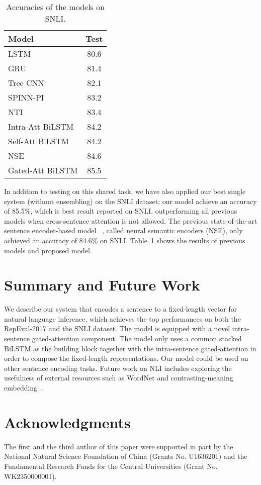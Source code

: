\documentclass[11pt,letterpaper]{article}
\begin{document}
\begin{table}[t!]
\renewcommand{\arraystretch}{0.9}
\centering
\begin{tabular}{|l|c|}
\hline
Model     & Test\\
\hline
LSTM~\citep{Bowman:D15-1075} & 80.6 \\
GRU~\citep{DBLP:journals/corr/VendrovKFU15} & 81.4 \\
Tree CNN~\citep{Mou:P16-2022} & 82.1 \\
SPINN-PI~\citep{Bowman:P16-1139} & 83.2 \\
NTI~\citep{DBLP:journals/corr/MunkhdalaiY16b} & 83.4 \\
Intra-Att BiLSTM~\citep{DBLP:journals/corr/LiuSLW16} & 84.2 \\
Self-Att BiLSTM~\citep{DBLP:journals/corr/LinFSYXZB17} & 84.2 \\
NSE~\citep{DBLP:journals/corr/MunkhdalaiY16} & 84.6 \\
\hline
Gated-Att BiLSTM & 85.5 \\
\hline
\end{tabular}
\caption{Accuracies of the models on SNLI. }
\label{tab:snli}
\end{table}

In addition to testing on this shared task, we have also applied our best single system (without ensembling) on the SNLI dataset; our model achieve an accuracy of 85.5\%, which is best result reported on SNLI, outperforming all previous models when cross-sentence attention is not allowed. The previous state-of-the-art sentence encoder-based model ~\citep{DBLP:journals/corr/MunkhdalaiY16b}, called neural semantic encoders (NSE), only achieved an accuracy of 84.6\% on SNLI. Table~\ref{tab:snli} shows the results of previous models and proposed model. 

\section{Summary and Future Work}

We describe our system that encodes a sentence to a fixed-length vector for natural language inference, which achieves the top performances on both the RepEval-2017 and the SNLI dataset. The model is equipped with a novel intra-sentence gated-attention component. The model only uses a common stacked BiLSTM as the building block together with the intra-sentence gated-attention in order to compose the fixed-length representations. Our model could be used on other sentence encoding tasks. Future work on NLI includes exploring the usefulness of external resources such as WordNet and contrasting-meaning embedding~\citep{Chen:P15-1011}.

\section*{Acknowledgments}
The first and the third author of this paper were supported in part by the National Natural Science Foundation of China (Grants
No. U1636201) and the Fundamental Research Funds for the Central Universities (Grant No. WK2350000001).

\clearpage


\end{document}
